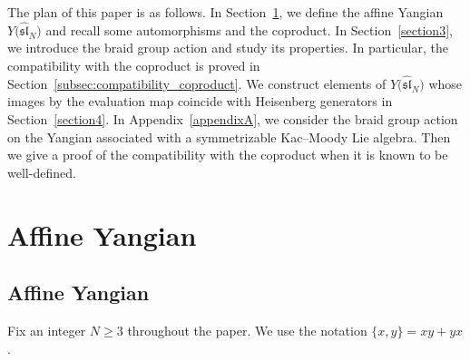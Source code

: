 \documentclass[10pt,a4paper]{amsart}
\theoremstyle{definition}
\numberwithin{equation}{section}
\newcommand{\affY}{Y\big(\affsl\big)}
\newcommand{\affsl}{\hat{\mathfrak{sl}}_N}
\begin{document}
The plan of this paper is as follows. In Section~\ref{sec:affine_Yangian}, we define the affine Yangian $\affY$ and recall some automorphisms and the coproduct. In Section~\ref{section3}, we introduce the braid group action and study its properties. In particular, the compatibility with the coproduct is proved in Section~\ref{subsec:compatibility_coproduct}. We construct elements of $\affY$ whose images by the evaluation map coincide with Heisenberg generators in Section~\ref{section4}. In Appendix~\ref{appendixA}, we consider the braid group action on the Yangian associated with a symmetrizable Kac--Moody Lie algebra. Then we give a proof of the compatibility with the coproduct when it is known to be well-defined.

\section{Affine Yangian}\label{sec:affine_Yangian}

\subsection{Affine Yangian}

Fix an integer $N \geq 3$ throughout the paper. We use the notation $\{x,y\}=xy+yx$.
\end{document}
